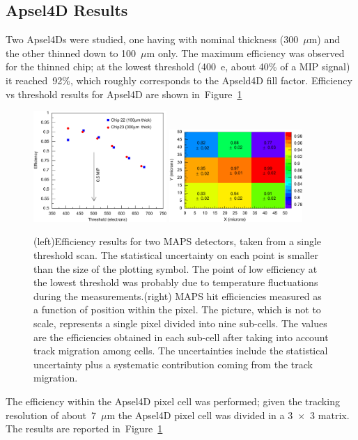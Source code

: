\subsection{Apsel4D Results}
Two Apsel4Ds were studied, one having with nominal thickness (300~$\mu$m) and the other 
thinned down to 100~$\mu$m only. The maximum efficiency was observed for the 
thinned chip; at the lowest threshold (400~e, about 40\% of a MIP signal) it reached~92\%, which roughly corresponds to 
the Apseld4D fill factor. 
Efficiency vs threshold results for Apsel4D are shown in~Figure~\ref{fig:maps_eff}

\begin{figure}[!htpb]
\centering
\includegraphics[width=0.45\textwidth]{maps_eff.jpg}
\includegraphics[width=0.45\textwidth]{maps_res.jpg}
\caption{\label{fig:maps_eff}(left)Efficiency results for two MAPS detectors, taken from a single threshold 
scan. The statistical uncertainty on each point is smaller than the size of the plotting symbol. The point 
of low efficiency at the lowest threshold was probably due to temperature fluctuations during the 
measurements.(right) MAPS hit efficiencies measured as a function of position within the pixel. The picture, which is not to scale, represents a single pixel divided into nine sub-cells. The values are the efficiencies obtained in each sub-cell after taking into account track migration among cells. The uncertainties include the statistical uncertainty plus a systematic contribution coming from the track migration.}
\end{figure}
The efficiency within the Apsel4D pixel cell was performed; given the tracking resolution 
of about~7~$\mu$m the Apsel4D pixel cell was divided in a 3~$\times$~3 matrix. The results 
are reported in~Figure~\ref{fig:maps_eff}


